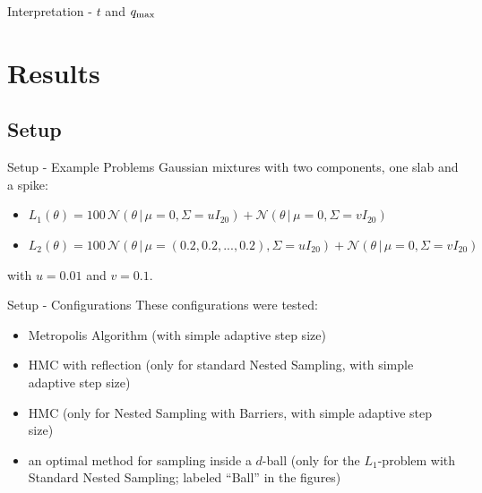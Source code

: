 \documentclass[]{beamer}
\begin{document}
  \begin{frame}{Interpretation - $t$ and $q_{\textnormal{max}}$}
    \centering
  \end{frame}
  \section{Results}
  \subsection*{Setup}
  \begin{frame}{Setup - Example Problems}
    Gaussian mixtures with two components, one slab and a spike:
    \begin{itemize}
      \item $L_1(\theta) = 100 \, \mathcal{N}(\theta \,|\, \mu=0, \Sigma= u I_{20}) + \mathcal{N}(\theta \,|\, \mu=0, \Sigma= v I_{20})$
      \item $L_2(\theta) = 100 \, \mathcal{N}(\theta \,|\, \mu=(0.2, 0.2, ..., 0.2), \Sigma= u I_{20}) + \mathcal{N}(\theta \,|\, \mu=0, \Sigma= v I_{20})$
    \end{itemize}
    with $u = 0.01$ and $v = 0.1$.
  \end{frame}
  \begin{frame}{Setup - Configurations}
    These configurations were tested:
    \begin{itemize}
      \item Metropolis Algorithm (with simple adaptive step size)
      \item HMC with reflection (only for standard Nested Sampling, with simple adaptive step size) \cite{hmc_in_ns}
      \item HMC (only for Nested Sampling with Barriers, with simple adaptive step size)
      \item an optimal method for sampling inside a $d$-ball (only for the $L_1$-problem with Standard Nested Sampling; labeled ``Ball'' in the figures)  
    \end{itemize}
  \end{frame}
\end{document}
